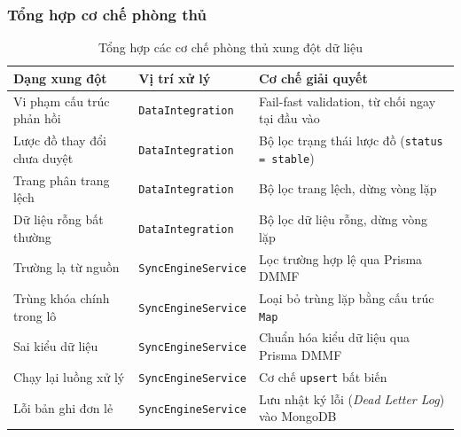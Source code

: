 \subsubsection{Tổng hợp cơ chế phòng thủ}

\begin{table}[H]
\centering
\caption{Tổng hợp các cơ chế phòng thủ xung đột dữ liệu}
\begin{tabular}{p{4.2cm}p{3.5cm}p{6.5cm}}
\hline
\textbf{Dạng xung đột} & \textbf{Vị trí xử lý} & \textbf{Cơ chế giải quyết} \\
\hline
Vi phạm cấu trúc phản hồi  & \texttt{DataIntegration} & Fail-fast validation, từ chối ngay tại đầu vào \\
Lược đồ thay đổi chưa duyệt & \texttt{DataIntegration} & Bộ lọc trạng thái lược đồ (\texttt{status = stable}) \\
Trang phân trang lệch   & \texttt{DataIntegration} & Bộ lọc trang lệch, dừng vòng lặp \\
Dữ liệu rỗng bất thường & \texttt{DataIntegration} & Bộ lọc dữ liệu rỗng, dừng vòng lặp \\
Trường lạ từ nguồn      & \texttt{SyncEngineService}      & Lọc trường hợp lệ qua Prisma DMMF \\
Trùng khóa chính trong lô & \texttt{SyncEngineService} & Loại bỏ trùng lặp bằng cấu trúc \texttt{Map} \\
Sai kiểu dữ liệu        & \texttt{SyncEngineService}      & Chuẩn hóa kiểu dữ liệu qua Prisma DMMF \\
Chạy lại luồng xử lý    & \texttt{SyncEngineService}      & Cơ chế \texttt{upsert} bất biến \\
Lỗi bản ghi đơn lẻ      & \texttt{SyncEngineService}      & Lưu nhật ký lỗi (\textit{Dead Letter Log}) vào MongoDB \\
\hline
\end{tabular}
\end{table}


